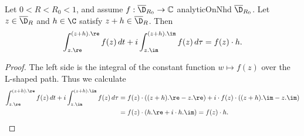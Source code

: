 \begin{lemma}\label{lem:integral_of_constant_over_L_path}
\leanok
Let $0<R<R_0<1$, and assume $f:\overline{\D}_{R_0}\to\mathbb{C}$ analyticOnNhd $\overline{\D}_{R_0}$. Let $z \in \overline{\D}_R$ and $h\in\C$ satisfy $z+h \in \overline{\D}_R$. Then
\[ \int_{z.\re}^{(z+h).\re} f(z)\,dt + i \int_{z.\im}^{(z+h).\im} f(z)\,d\tau = f(z) \cdot h. \]
\end{lemma}
\begin{proof}
\leanok
The left side is the integral of the constant function $w \mapsto f(z)$ over the L-shaped path. Thus we calculate
\begin{align*}
\int_{z.\re}^{(z+h).\re} f(z)\,dt + i \int_{z.\im}^{(z+h).\im} f(z)\,d\tau &= f(z) \cdot ((z+h).\re - z.\re) + i \cdot f(z) \cdot ((z+h).\im - z.\im) \\
& = f(z) \cdot (h.\re + i \cdot h.\im) = f(z) \cdot h.
\end{align*}
\end{proof}

